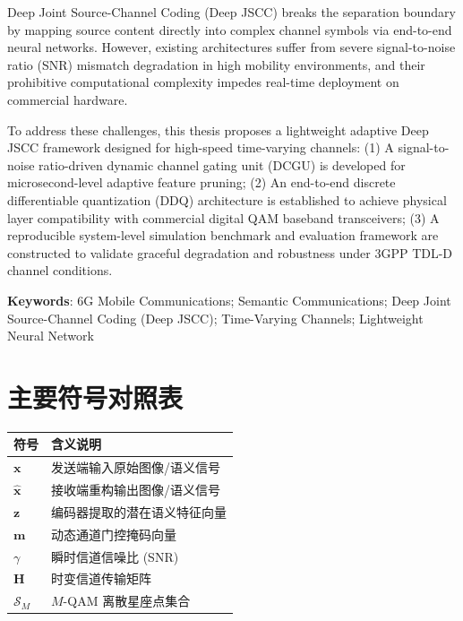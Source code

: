 \documentclass[12pt,a4paper,openany,UTF8]{ctexrep}
\begin{document}
Deep Joint Source-Channel Coding (Deep JSCC) breaks the separation boundary by mapping source content directly into complex channel symbols via end-to-end neural networks. However, existing architectures suffer from severe signal-to-noise ratio (SNR) mismatch degradation in high mobility environments, and their prohibitive computational complexity impedes real-time deployment on commercial hardware.

To address these challenges, this thesis proposes a lightweight adaptive Deep JSCC framework designed for high-speed time-varying channels:
(1) A signal-to-noise ratio-driven dynamic channel gating unit (DCGU) is developed for microsecond-level adaptive feature pruning;
(2) An end-to-end discrete differentiable quantization (DDQ) architecture is established to achieve physical layer compatibility with commercial digital QAM baseband transceivers;
(3) A reproducible system-level simulation benchmark and evaluation framework are constructed to validate graceful degradation and robustness under 3GPP TDL-D channel conditions.

\vspace{0.6cm}
\noindent \textbf{Keywords}: 6G Mobile Communications; Semantic Communications; Deep Joint Source-Channel Coding (Deep JSCC); Time-Varying Channels; Lightweight Neural Network

\newpage

\tableofcontents
\newpage

\listoffigures
\newpage
\listoftables
\newpage

\chapter*{主要符号对照表}
\begin{center}
\begin{tabular}{ll}
  \toprule
  \textbf{符号} & \textbf{含义说明} \\
  \midrule
  $\bm{x}$ & 发送端输入原始图像/语义信号 \\
  $\hat{\bm{x}}$ & 接收端重构输出图像/语义信号 \\
  $\bm{z}$ & 编码器提取的潜在语义特征向量 \\
  $\bm{m}$ & 动态通道门控掩码向量 \\
  $\gamma$ & 瞬时信道信噪比 (SNR) \\
  $\bm{H}$ & 时变信道传输矩阵 \\
  $\mathcal{S}_M$ & $M$-QAM 离散星座点集合 \\
  \bottomrule
\end{tabular}
\end{center}
\newpage
\end{document}

